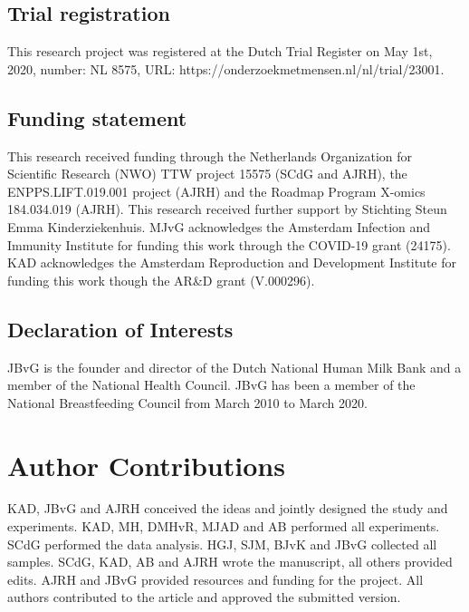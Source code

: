 \subsection{Trial registration}
This research project was registered at the Dutch Trial Register on May 1st, 2020, number: NL 8575, URL: https://onderzoekmetmensen.nl/nl/trial/23001.


\subsection{Funding statement}
This research received funding through the Netherlands Organization for Scientific Research (NWO) TTW project 15575 (SCdG and AJRH), the ENPPS.LIFT.019.001 project (AJRH) and the Roadmap Program X-omics 184.034.019 (AJRH). This research received further support by Stichting Steun Emma Kinderziekenhuis. MJvG acknowledges the Amsterdam Infection and Immunity Institute for funding this work through the COVID-19 grant (24175). KAD acknowledges the Amsterdam Reproduction and Development Institute for funding this work though the AR\&D grant (V.000296).

\subsection{Declaration of Interests}
JBvG is the founder and director of the Dutch National Human Milk Bank and a member of the National Health Council. JBvG has been a member of the National Breastfeeding Council from March 2010 to March 2020.


\section{Author Contributions}
KAD, JBvG and AJRH conceived the ideas and jointly designed the study and experiments. KAD, MH, DMHvR, MJAD and AB performed all experiments. SCdG performed the data analysis. HGJ, SJM, BJvK and JBvG collected all samples. SCdG, KAD, AB and AJRH wrote the manuscript, all others provided edits. AJRH and JBvG provided resources and funding for the project. All authors contributed to the article and approved the submitted version.


